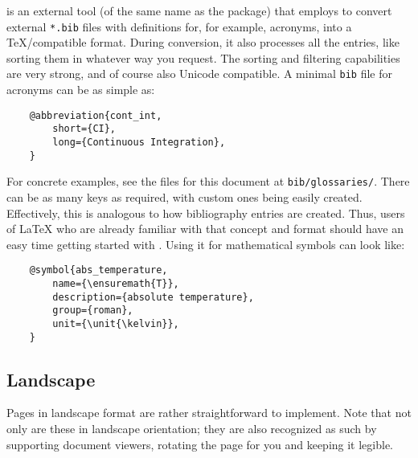  is an external tool (of the same name as the package) that
 employs to convert external \texttt{*.bib} files with
definitions for, for example, acronyms, into a \TeX{}\-/compatible format.
During conversion, it also processes all the entries, like sorting them in whatever
way you request.
The sorting and filtering capabilities are very strong, and of course also Unicode
compatible.
A minimal \texttt{bib} file for acronyms can be as simple as:
\begin{verbatim}
    @abbreviation{cont_int,
        short={CI},
        long={Continuous Integration},
    }
\end{verbatim}
For concrete examples, see the files for this document at \texttt{bib/glossaries/}.
There can be as many keys as required, with custom ones being easily created.
Effectively, this is analogous to how bibliography entries are created.
Thus, users of \LaTeX{} who are already familiar with that concept and format
should have an easy time getting started with .
Using it for mathematical symbols can look like:
\begin{verbatim}
    @symbol{abs_temperature,
        name={\ensuremath{T}},
        description={absolute temperature},
        group={roman},
        unit={\unit{\kelvin}},
    }
\end{verbatim}

\begin{landscape}
    \section{Landscape}

    Pages in landscape format are rather straightforward to implement.
    Note that not only are these in landscape orientation; they are also recognized
    as such by supporting document viewers, rotating the page for you and keeping
    it legible.
\end{landscape}
